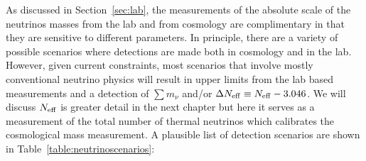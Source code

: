 As discussed in Section~\ref{sec:lab}, the measurements of the absolute scale of the neutrinos masses from the lab and from cosmology are complimentary in that they are sensitive to different parameters.  In principle, there are a variety of possible scenarios where detections are made both in cosmology and in the lab.  However, given current constraints, most scenarios that involve mostly conventional neutrino physics will result in upper limits from the lab based measurements and a detection of $\sum m_\nu$ and/or $\Delta N_{\rm eff} \equiv N_{\rm eff} - 3.046$.  We will discuss $N_{\rm eff}$ is greater detail in the next chapter but here it serves as a measurement of the total number of thermal neutrinos which calibrates the cosmological mass measurement. A plausible list of detection scenarios are shown in Table~\ref{table:neutrinoscenarios}:

